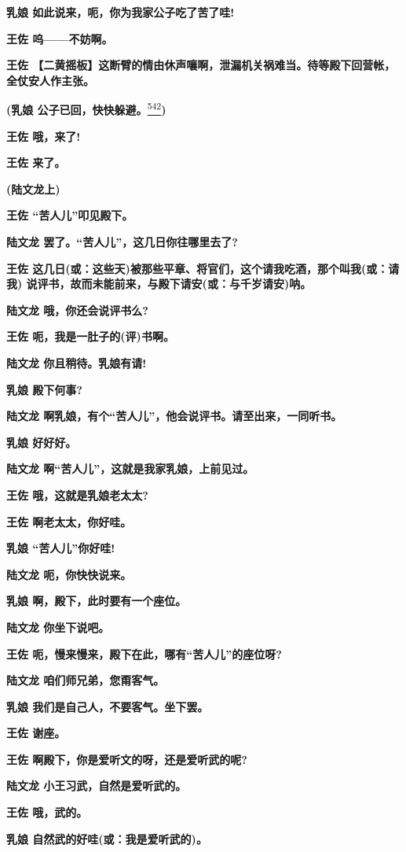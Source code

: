 \textbf{乳娘 如此说来，呃，你为我家公子吃了苦了哇!}

\textbf{王佐 呜------不妨啊。}

\textbf{王佐
【二黄摇板】这断臂的情由休声嚷啊，泄漏机关祸难当。待等殿下回营帐，全仗安人作主张。}

\textbf{(乳娘
公子已回，快快躲避。}\protect\hyperlink{fn542}{\textsuperscript{542}}\textbf{)}

\textbf{王佐 哦，来了!}

\textbf{王佐 来了。}

\textbf{(陆文龙上)}

\textbf{王佐 ``苦人儿''叩见殿下。}

\textbf{陆文龙 罢了。``苦人儿''，这几日你往哪里去了?}

\textbf{王佐
这几日(或：这些天)被那些平章、将官们，这个请我吃酒，那个叫我(或：请我)
说评书，故而未能前来，与殿下请安(或：与千岁请安)呐。}

\textbf{陆文龙 哦，你还会说评书么?}

\textbf{王佐 呃，我是一肚子的(评)书啊。}

\textbf{陆文龙 你且稍待。乳娘有请!}

\textbf{乳娘 殿下何事?}

\textbf{陆文龙 啊乳娘，有个``苦人儿''，他会说评书。请至出来，一同听书。}

\textbf{乳娘 好好好。}

\textbf{陆文龙 啊``苦人儿''，这就是我家乳娘，上前见过。}

\textbf{王佐 哦，这就是乳娘老太太?}

\textbf{王佐 啊老太太，你好哇。}

\textbf{乳娘 ``苦人儿''你好哇!}

\textbf{陆文龙 呃，你快快说来。}

\textbf{乳娘 啊，殿下，此时要有一个座位。}

\textbf{陆文龙 你坐下说吧。}

\textbf{王佐 呃，慢来慢来，殿下在此，哪有``苦人儿''的座位呀?}

\textbf{陆文龙 咱们师兄弟，您甭客气。}

\textbf{乳娘 我们是自己人，不要客气。坐下罢。}

\textbf{王佐 谢座。}

\textbf{王佐 啊殿下，你是爱听文的呀，还是爱听武的呢?}

\textbf{陆文龙 小王习武，自然是爱听武的。}

\textbf{王佐 哦，武的。}

\textbf{乳娘 自然武的好哇(或：我是爱听武的)。}

